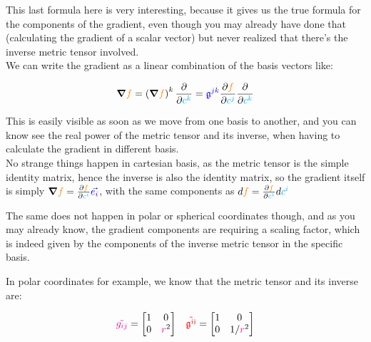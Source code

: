 This last formula here is very interesting, because it gives us the true formula for the components 
of the gradient, even though you may already have done that (calculating the gradient of a scalar vector) but 
never realized that there's the inverse metric tensor involved.\\

We can write the gradient as a linear combination of the basis vectors like:

\begin{align*}
    \grad{\begingroup\color{orange}f\endgroup} = \left(\grad{\begingroup\color{orange}f\endgroup}\right)^k \frac{\partial}{\partial \begingroup\color{cyan}c^k\endgroup}
    =  \begingroup\color{blue}\mathfrak{g}^{jk}\endgroup \frac{\partial \begingroup\color{orange}f\endgroup}{\partial \begingroup\color{cyan}c^j\endgroup}
    \frac{\partial}{\partial \begingroup\color{cyan}c^k\endgroup}
\end{align*}

This is easily visible as soon as we move from one basis to another, and you can know see the real power of the metric tensor and its inverse, when 
having to calculate the gradient in different basis.\\

No strange things happen in cartesian basis, as the metric tensor is the simple identity matrix, hence the inverse is also the identity matrix, so the gradient itself 
is simply $\grad{\begingroup\color{orange}f\endgroup} = \frac{\partial \begingroup\color{orange}f\endgroup}{\partial \begingroup\color{cyan}c^i\endgroup} \begingroup\color{blue}\vec{e_i}\endgroup$, with the same components as $d\begingroup\color{orange}f\endgroup = \frac{\partial \begingroup\color{orange}f\endgroup}{\partial \begingroup\color{cyan}c^i\endgroup} d\begingroup\color{cyan}c^i\endgroup$

The same does not happen in polar or spherical coordinates though, and as you may already know, the gradient components are requiring a scaling factor, 
which is indeed given by the components of the inverse metric tensor in the specific basis.

In polar coordinates for example, we know that the metric tensor and its inverse are:

\begin{align*}
    \begingroup\color{magenta}\tilde{g_{ij}}\endgroup = \begin{bmatrix}
    1 & 0\\
    0 & \begingroup\color{magenta}r\endgroup^2
    \end{bmatrix} &&
    \begingroup\color{red}\mathfrak{\tilde{g^{ij}}}\endgroup = \begin{bmatrix}
    1 & 0\\
    0 & 1/\begingroup\color{magenta}r\endgroup^2
    \end{bmatrix}
\end{align*}

